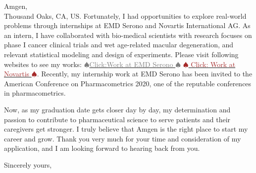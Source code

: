 \documentclass[9pt]{letter} %
\begin{document}
\begin{letter}{
Amgen,\\
Thousand Oaks, CA, US.}
Fortunately, I had opportunities to explore real-world problems through internships at EMD Serono and Novartis International AG. As an intern, I have collaborated with bio-medical scientists with research focuses on phase I cancer clinical trials and wet age-related macular degeneration, and relevant statistical modeling and design of experiments. Please visit following websites to see my works: \href{https://sites.google.com/view/seyoonlee/home/projects/merck-group-summer-internship-project?authuser=0}{\textcolor{gray}{$\spadesuit$Click:Work at EMD Serono $\spadesuit$}}
\href{https://sites.google.com/view/seyoonlee/home/projects/novartis-summer-internship-project?authuser=0#h.dfc3zhswkx8m}{\textcolor{brown}{$\spadesuit$ Click: Work at Novartis $\spadesuit$}}. Recently, my internship work at EMD Serono has been invited to the American Conference on Pharmacometrics 2020, one of the reputable conferences in pharmacometrics. 

Now, as my graduation date gets closer day by day, my determination and passion to contribute to pharmaceutical science to serve patients and their caregivers get stronger. I truly believe that Amgen is the right place to start my career and grow. Thank you very much for your time and consideration of my application, and I am looking forward to hearing back from you. 


\closing{Sincerely yours,}


\end{letter}
\end{document}

